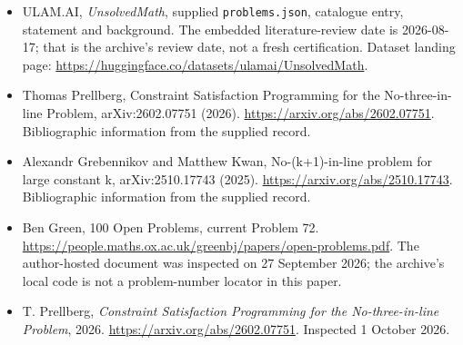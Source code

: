 \documentclass[11pt,a4paper]{article}
\begin{document}
{\small

\begin{itemize}

\item[\hypertarget{source:statement:1}{S1}] ULAM.AI, \emph{UnsolvedMath}, supplied \texttt{problems.json}, catalogue entry, statement and background. The embedded literature-review date is 2026-08-17; that is the archive’s review date, not a fresh certification. Dataset landing page: \url{https://huggingface.co/datasets/ulamai/UnsolvedMath}.

\item[\hypertarget{source:statement:2}{S2}] Thomas Prellberg, Constraint Satisfaction Programming for the No-three-in-line Problem, arXiv:2602.07751 (2026). \url{https://arxiv.org/abs/2602.07751}. Bibliographic information from the supplied record.

\item[\hypertarget{source:statement:3}{S3}] Alexandr Grebennikov and Matthew Kwan, No-(k+1)-in-line problem for large constant k, arXiv:2510.17743 (2025). \url{https://arxiv.org/abs/2510.17743}. Bibliographic information from the supplied record.

\item[\hypertarget{source:statement:4}{S4}] Ben Green, 100 Open Problems, current Problem 72. \url{https://people.maths.ox.ac.uk/greenbj/papers/open-problems.pdf}. The author-hosted document was inspected on 27 September 2026; the archive’s local code is not a problem-number locator in this paper.

\item[E1] T. Prellberg, \emph{Constraint Satisfaction Programming for the No-three-in-line Problem}, 2026. \url{https://arxiv.org/abs/2602.07751}. Inspected 1 October 2026.

\end{itemize}

}

\label{end:statement}
\end{document}
